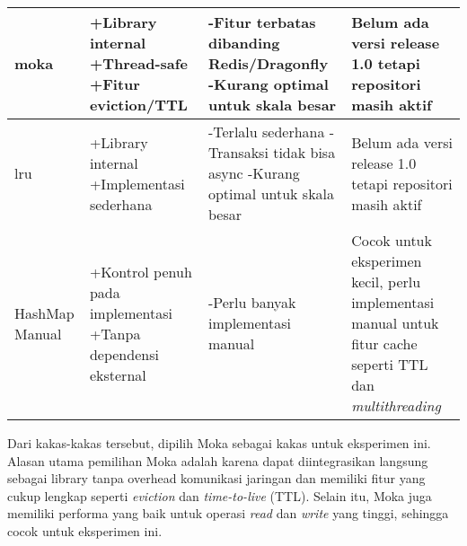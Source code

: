 \begin{table}[h]
{\begin{tabular}{|l|p{5cm}|p{5cm}|p{3cm}|}
            moka & +Library internal \newline +Thread-safe \newline +Fitur eviction/TTL & -Fitur terbatas dibanding Redis/Dragonfly \newline -Kurang optimal untuk skala besar & Belum ada versi release 1.0 tetapi repositori masih aktif\\ \hline
            lru & +Library internal \newline +Implementasi sederhana & -Terlalu sederhana \newline -Transaksi tidak bisa async \newline -Kurang optimal untuk skala besar & Belum ada versi release 1.0 tetapi repositori masih aktif\\ \hline
            HashMap Manual & +Kontrol penuh pada implementasi \newline +Tanpa dependensi eksternal & -Perlu banyak implementasi manual & Cocok untuk eksperimen kecil, perlu implementasi manual untuk fitur cache seperti TTL dan \textit{multithreading}\\ \hline
        \end{tabular}
    }
    \label{tab:tools-kv}
\end{table}

Dari kakas-kakas tersebut, dipilih Moka sebagai kakas untuk eksperimen ini. Alasan utama pemilihan Moka adalah karena dapat diintegrasikan langsung sebagai library tanpa overhead komunikasi jaringan dan memiliki fitur yang cukup lengkap seperti \textit{eviction} dan \textit{time-to-live} (TTL). Selain itu, Moka juga memiliki performa yang baik untuk operasi \textit{read} dan \textit{write} yang tinggi, sehingga cocok untuk eksperimen ini.
